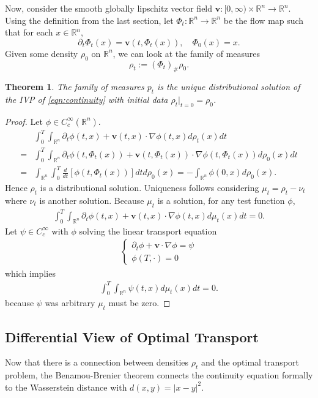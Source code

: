\documentclass[12pt]{article}
\newcommand{\R}{\mathbb{R}}
\theoremstyle{plain}
\newtheorem{thm}{Theorem}[section]
\numberwithin{equation}{section}
\begin{document}
Now, consider the smooth globally lipschitz vector field $\mathbf{v}: [0,\infty)\times \mathbb{R}^n\to \mathbb{R}^n.$
Using the definition from the last section, let $\Phi_t: \mathbb{R}^n\to \mathbb{R}^n$ be the flow map such that for each $x\in \mathbb{R}^n$,
\[\partial_t\Phi_t(x) = \mathbf{v}(t,\Phi_t(x)),\quad \Phi_0(x) = x.\]
Given some density $\rho_0$ on $\mathbb{R}^n$, we can look at the family of measures 
\[\rho_t := (\Phi_t)_\# \rho_0.\]
\begin{thm}
	The family of measures $p_t$ is the unique distributional solution of the IVP of \eqref{eqn:continuity} with initial data $\rho_t\vert_{t=0} = \rho_0$.
\end{thm}
\begin{proof}
	Let $\phi\in C^\infty_c(\mathbb{R}^n)$.
	\begin{align*}
		&\int_0^T \int_{\mathbb{R}^n}\partial_t\phi(t,x) + \mathbf{v}(t,x)\cdot \nabla\phi(t,x)d\rho_t(x)dt\\
	  = &\int_0^T\int_{\mathbb{R}^n}\partial_t\phi(t,\Phi_t(x)) + \mathbf{v}(t,\Phi_t(x))\cdot \nabla\phi(t,\Phi_t(x))d\rho_0(x)dt \\
	  = &\int_{\mathbb{R}^n}\int_0^T \frac{d}{dt}[\phi(t,\Phi_t(x))]dtd\rho_0(x) = - \int_{\mathbb{R}^n}\phi(0,x)d\rho_0(x).
	\end{align*}
	Hence $\rho_t$ is a distributional solution. Uniqueness follows considering $\mu_t = \rho_t-\nu_t$ where $\nu_t$ is another solution.
  Because $\mu_t$ is a solution, for any test function $\phi$,
  \begin{align*}
    \int_0^T \int_{\R^n}\partial_t\phi(t,x) + \mathbf{v}(t,x)\cdot\nabla\phi(t,x)d\mu_{t}(x)dt = 0.
  \end{align*}
  Let $\psi\in C_c^\infty$ with $\phi$ solving the linear transport equation
  \begin{align*}
    \begin{cases}
      \partial_t\phi + \mathbf{v}\cdot \nabla \phi = \psi \\
      \phi(T,\cdot) = 0
    \end{cases}
  \end{align*}
  which implies 
  \begin{align*}
    \int_0^T \int_{\R^n}\psi(t,x)d\mu_{t}(x)dt = 0.
  \end{align*}
  because $\psi$ was arbitrary $\mu_t$ must be zero.
\end{proof}
\subsection{Differential View of Optimal Transport}
Now that there is a connection between densities $\rho_t$ and the optimal transport problem, the Benamou-Brenier theorem connects the continuity equation formally to the Wasserstein distance with $d(x,y) = |x-y|^2$.
\end{document}
